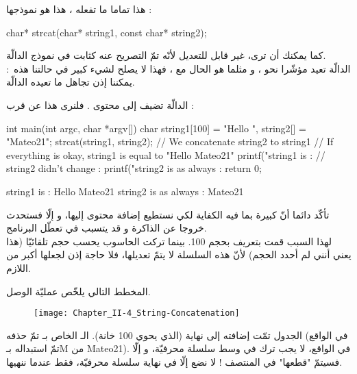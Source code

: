 هذا تماما ما تفعله
، هذا هو نموذجها :

\begin{Csource}
char* strcat(char* string1, const char* string2);
\end{Csource}

كما يمكنك أن ترى،
غير قابل للتعديل لأنّه تمّ التصريح عنه كثابت في نموذج الدالّة.\\
الدالّة تعيد مؤشّرا نحو
،
و مثلما هو الحال مع
،
فهذا لا يصلح لشيء كبير في حالتنا هذه~: يمكننا إذن تجاهل ما تعيده الدالّة.

الدالّة تضيف إلى
محتوى
.
فلنرى هذا عن قرب :

\begin{Csource}
int main(int argc, char *argv[])
{
	char string1[100] = "Hello ", string2[] = "Mateo21";
	strcat(string1, string2); // We concatenate string2 to string1
	// If everything is okay, string1 is equal to "Hello Mateo21"
	 printf("string1 is : %
	// string2 didn't change :
	printf("string2 is as always : %
	return 0;
}
\end{Csource}

\begin{Console}
string1 is : Hello Mateo21
string2 is as always : Mateo21
\end{Console}

تأكّد دائما أنّ
كبيرة بما فيه الكفاية لكي نستطيع إضافة محتوى
إليها، و إلّا فستحدث خروجا عن الذاكرة و قد يتسبب في تعطّل البرنامج.\\
لهذا السبب قمت بتعريف
بحجم 100. بينما تركت الحاسوب يحسب حجم
تلقائيّا (هذا يعني أنني لم أحدد الحجم) لأنّ هذه السلسلة لا يتمّ تعديلها، فلا حاجة إذن لجعلها أكبر من اللازم.

المخطط التالي يلخّص عمليّة الوصل.

\begin{figure}[H]
	\centering
	\texttt{[image: Chapter\_II-4\_String-Concatenation]}
\end{figure}

الجدول
تمّت إضافته إلى نهاية
(الذي يحوي 100 خانة).
الـ
الخاص بـ
تمّ حذفه (في الواقع تمّ استبداله بـ\textenglish{M} من \textenglish{Mateo21}). في الواقع، لا يجب ترك
في وسط سلسلة محرفيّة، و إلّا فسيتمّ "قطعها" في المنتصف ! لا نضع
إلّا في نهاية سلسلة محرفيّة، فقط عندما ننهيها.

